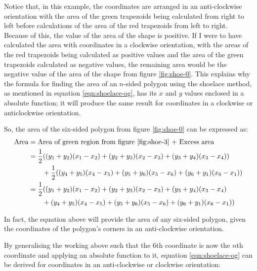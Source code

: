 \documentclass[12pt]{article}
\begin{document}
Notice that, in this example, the coordinates are arranged in an anti-clockwise orientation with the area of the green trapezoids being calculated from right to left before calculations of the area of the red trapezoids from left to right. Because of this, the value of the area of the shape is positive. If I were to have calculated the area with coordinates in a clockwise orientation, with the areas of the red trapezoids being calculated as positive values and the area of the green trapezoids calculated as negative values, the remaining area would be the negative value of the area of the shape from figure \ref{fig:shoe-0}. This explains why the formula for finding the area of an $n$-sided polygon using the shoelace method, as mentioned in equation \ref{eqn:shoelace-og}, has its $x$ and $y$ values enclosed in a absolute function; it will produce the same result for coordinates in a clockwise or anticlockwise orientation.\newline

So, the area of the six-sided polygon from figure \ref{fig:shoe-0} can be expressed as:
\bgroup
\singlespacing
\begin{align*}
    \text{Area} &=\text{Area of green region from figure \ref{fig:shoe-3} + Excess area}\\
    &=\frac{1}{2}((y_1+y_2)(x_1-x_2)
    +(y_2+y_3)(x_2-x_3)
    +(y_3+y_4)(x_3-x_4))\\&\qquad+
    \frac{1}{2}((y_4+y_5)(x_4-x_5)
    +(y_5+y_6)(x_5-x_6)
    +(y_6+y_1)(x_6-x_1))\\
    &=\frac{1}{2}((y_1+y_2)(x_1-x_2)
    +(y_2+y_3)(x_2-x_3)
    +(y_3+y_4)(x_3-x_4)\\&\qquad+
    (y_4+y_5)(x_4-x_5)
    +(y_5+y_6)(x_5-x_6)
    +(y_6+y_1)(x_6-x_1))
\end{align*}
\egroup

In fact, the equation above will provide the area of any six-sided polygon, given the coordinates of the polygon's corners in an anti-clockwise orientation.\newline

By generalising the working above such that the $6$th coordinate is now the $n$th coordinate and applying an absolute function to it, equation \ref{eqn:shoelace-og} can be derived for coordinates in an anti-clockwise or clockwise orientation:
\end{document}
